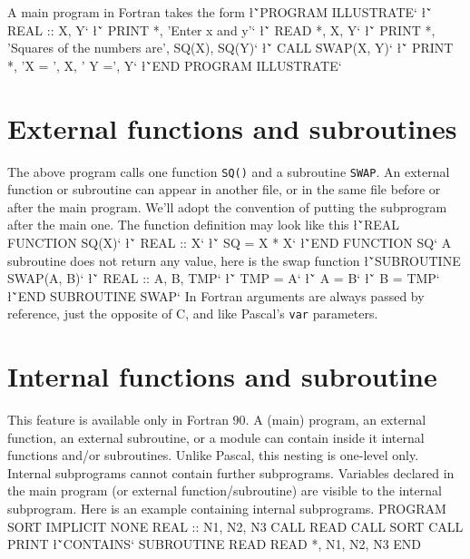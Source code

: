 {A main program in Fortran takes the form
\sms
\l{\v`PROGRAM ILLUSTRATE`}
\l{\v`   REAL :: X, Y`}
\l{\v`   PRINT *, 'Enter x and y'`\m{}}
\l{\v`   READ *, X, Y`}
\l{\v`   PRINT *, 'Squares of the numbers are', SQ(X), SQ(Y)`}
\l{\v`   CALL SWAP(X, Y)`}
\l{\v`   PRINT *, 'X = ', X, ' Y =', Y`\m{}}
\l{\v`END PROGRAM ILLUSTRATE`}
\sms

\section{External functions and subroutines}

The above program calls one function {\tt SQ()} and a subroutine 
{\tt SWAP}.  An external function or subroutine can appear in another
file,  or in the same file before or after the main program. 
We'll adopt the convention of putting the subprogram after the main
one.   The function definition may look like this
\sms
\l{\v`REAL FUNCTION SQ(X)`}
\l{\v`   REAL :: X`}
\l{\v`   SQ = X * X`}
\l{\v`END FUNCTION SQ`}
\sms
A subroutine does not return any value, here is the swap function
\sms
\l{\v`SUBROUTINE SWAP(A, B)`}
\l{\v`   REAL :: A, B, TMP`}
\l{\v`   TMP = A`\m{}}
\l{\v`   A = B`\m{}}
\l{\v`   B = TMP`\m{}}
\l{\v`END SUBROUTINE SWAP`}
\sms
In Fortran arguments are always passed by reference, just the opposite of 
C, and like Pascal's {\tt var} parameters. 

\section{Internal functions and subroutine}
This feature is available only in Fortran 90.  A (main) program,
an external function, an external subroutine, or a module can contain
inside it internal functions and/or subroutines.   
Unlike Pascal, this nesting is one-level only.  Internal 
subprograms cannot contain further subprograms.  Variables declared
in the  main program (or external function/\-subroutine) are visible
to the internal subprogram.  Here is an example containing internal
subprograms.  
\ttbg
PROGRAM SORT
   IMPLICIT NONE
   REAL :: N1, N2, N3
\tted
\ttbg
   CALL READ
   CALL SORT
   CALL PRINT
\tted
\sms
\l{\v`CONTAINS`}
\sms
\ttbg   
   SUBROUTINE READ
      READ *, N1, N2, N3
   END 

}
